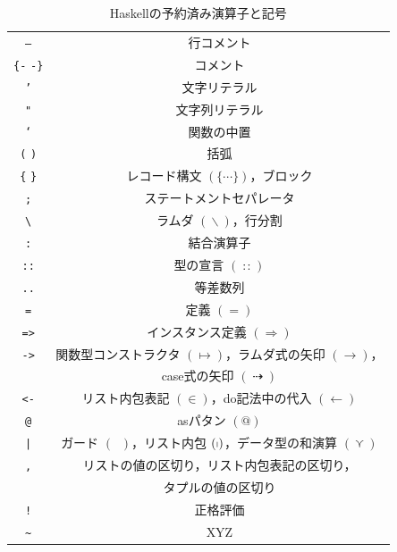 \documentclass[a5paper,twoside,fleqn,draft]{jsbook}
\newcommand{\programminglanguage}[1]{\textsf{#1}}
\newcommand{\haskell}{\programminglanguage{Haskell}}
\newcommand{\code}[1]{\texttt{#1}}
\DeclareMathOperator{\mSuperClass}{\Rightarrow}
\DeclareMathOperator{\mDoEq}{\leftarrow}
\DeclareMathOperator{\mFrom}{\in}
\DeclareMathOperator{\mIfSo}{\dashrightarrow}
\DeclareMathOperator{\mIn}{{:\!:}}
\DeclareMathOperator{\mLambda}{\backslash}
\DeclareMathOperator{\mValueOr}{\curlyvee}
\newcommand{\mGuard}[1]{\mathop{\mid_{#1}}}
\DeclareMathOperator{\mListComp}{\shortmid}
\begin{document}
\begin{table}
\caption{\haskell の予約済み演算子と記号}
\label{tab:reserved-symbols}
\begin{center}
\begin{tabular}{||c|c||}
\hline
\code{--}&行コメント\\
\code{\{-} \code{-\}}&コメント\\
\hline
\code{'}&文字リテラル\\
\code{"}&文字列リテラル\\%
\code{`}&関数の中置\\
\code{(} \code{)}&括弧\\
\code{\{} \code{\}}&レコード構文 $(\{\dotsb\})$，ブロック\\
\code{;}&ステートメントセパレータ\\
\hline
\code{\textbackslash}&ラムダ $(\mLambda)$，行分割\\
\code{:}&結合演算子\\
\code{::}&型の宣言 $(\mIn)$\\
\code{..}&等差数列\\
\code{=}&定義 $(=)$\\
\code{=>}&インスタンス定義 $(\mSuperClass)$\\
\code{->}&関数型コンストラクタ $(\mapsto)$，ラムダ式の矢印 $(\rightarrow)$，\\
&case式の矢印 $(\mIfSo)$\\
\code{<-}&リスト内包表記 $(\mFrom)$，do記法中の代入 $(\mDoEq)$\\
\code{@}&asパタン $(@)$\\
\code{|}&ガード $(\mGuard{})$，リスト内包 $(\mListComp)$，データ型の和演算 $(\mValueOr)$\\
\code{,}&リストの値の区切り，リスト内包表記の区切り，\\
&タプルの値の区切り\\
\hline
\code{!}&正格評価\\
\code{\textasciitilde}&XYZ\\
\hline
\end{tabular}
\end{center}
\end{table}
\end{document}
